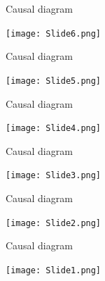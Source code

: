\documentclass[hyperref={pdfpagelabels=false}]{beamer}
\begin{document}
\begin{frame}{Causal diagram}
    \begin{center}
	\texttt{[image: Slide6.png]}
    \end{center}
\end{frame}

\begin{frame}{Causal diagram}
    \begin{center}
	\texttt{[image: Slide5.png]}
    \end{center}
\end{frame}

\begin{frame}{Causal diagram}
    \begin{center}
	\texttt{[image: Slide4.png]}
    \end{center}
\end{frame}

\begin{frame}{Causal diagram}
    \begin{center}
	\texttt{[image: Slide3.png]}
    \end{center}
\end{frame}

\begin{frame}{Causal diagram}
    \begin{center}
	\texttt{[image: Slide2.png]}
    \end{center}
\end{frame}

\begin{frame}{Causal diagram}
    \begin{center}
	\texttt{[image: Slide1.png]}
    \end{center}
\end{frame}
\end{document}
